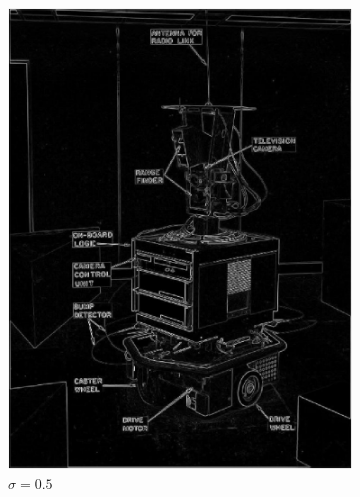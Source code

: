 \documentclass[lettersize,journal]{IEEEtran}
\begin{document}
\begin{figure}[h]
\begin{subfigure}[h]{0.115\textwidth}
        \includegraphics[width=\linewidth]{gaussian_edge_map_5x5_sigma_0.5}
        \caption{$\sigma=0.5$}  
    \end{subfigure}
    \begin{subfigure}[h]{0.115\textwidth}
        \centering

\end{subfigure}
\end{figure}
\end{document}
